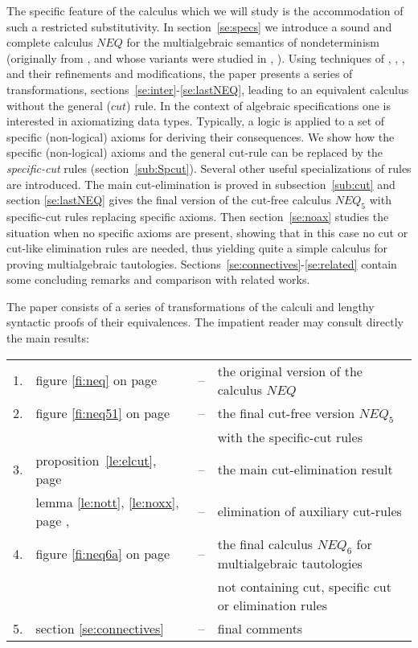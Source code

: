 \documentclass[10pt]{article}
\begin{document}
The specific feature of the calculus which we will study is the accommodation of such a
restricted substitutivity. 
In section~\ref{se:specs} we introduce a sound and complete calculus 
$NEQ$ for the
multialgebraic semantics of nondeterminism (originally from \cite{Mich}, and whose 
variants were studied in 
\cite{WM}, \cite{Top}). Using techniques of \cite{K}, \cite{Aida1}, \cite{Aida2},
and their refinements and modifications, the paper presents a series
of transformations, sections~\ref{se:inter}-\ref{se:lastNEQ}, leading
to an equivalent calculus without the general ($cut$) rule. 
In the context of algebraic specifications one is interested in axiomatizing data
types. Typically, a logic is applied to a set of specific (non-logical) axioms for
deriving their consequences.
We show how the
specific (non-logical) axioms and the general cut-rule can be replaced by 
the {\em specific-cut}
rules (section~\ref{sub:Spcut}). Several other useful specializations of rules are
introduced. The main cut-elimination is proved in subsection~\ref{sub:cut} and section
\ref{se:lastNEQ} gives the final version of the cut-free calculus $NEQ_5$ with
specific-cut rules replacing specific axioms.
Then section~\ref{se:noax} studies the situation when no specific
axioms are present, showing that in this case no cut or cut-like elimination rules 
are needed,
thus yielding quite a simple calculus for proving multialgebraic tautologies.
Sections~\ref{se:connectives}-\ref{se:related} contain some concluding remarks and
comparison with related works.

The paper consists of a series of transformations of the calculi and lengthy syntactic 
proofs of their equivalences.
The impatient reader may consult directly the main results:\\[1ex]
\begin{tabular}{rlcl}
1. &  figure \ref{fi:neq} on page \pageref{fi:neq} & -- & the original version of
the calculus $NEQ$ \\
2. & figure \ref{fi:neq51} on page \pageref{fi:neq51} & -- & the final cut-free
version $NEQ_5$ \\
 & & & with the specific-cut rules \\
3. & proposition~\ref{le:elcut}, page \pageref{le:elcut} 
       & -- & the main cut-elimination result \\
   & lemma \ref{le:nott}, \ref{le:noxx}, page \pageref{le:nott}, \pageref{le:noxx} 
       & -- & elimination of auxiliary cut-rules \\
4. & figure \ref{fi:neq6a} on page \pageref{fi:neq6a} & -- & the final calculus
$NEQ_6$ for multialgebraic tautologies\\ 
 & & & not containing cut, specific cut or elimination rules \\
5. & section \ref{se:connectives} & -- & final comments
\end{tabular}
\end{document}
